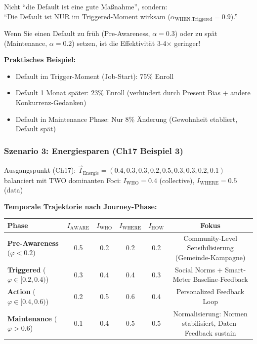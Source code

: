 \begin{tcolorbox}[colback=red!5!white, colframe=red!75!black, title=\textbf{Der Default-Nudge als Timing-Intervention}]

Nicht ``die Default ist eine gute Maßnahme'', sondern: \\
``Die Default ist NUR im Triggered-Moment wirksam ($\alpha_{\text{WHEN},\text{Triggered}} = 0.9$).''

Wenn Sie einen Default zu früh (Pre-Awareness, $\alpha = 0.3$) oder zu spät (Maintenance, $\alpha = 0.2$) setzen, ist die Effektivität 3-4× geringer!

\textbf{Praktisches Beispiel:}
\begin{itemize}[nosep]
\item Default im Trigger-Moment (Job-Start): 75\% Enroll
\item Default 1 Monat später: 23\% Enroll (verhindert durch Present Bias + andere Konkurrenz-Gedanken)
\item Default in Maintenance Phase: Nur 8\% Änderung (Gewohnheit etabliert, Default spät)
\end{itemize}

\end{tcolorbox}

\subsubsection{Szenario 3: Energiesparen (Ch17 Beispiel 3)}

Ausgangspunkt (Ch17): $\vec{I}_{\text{Energie}} = (0.4, 0.3, 0.3, 0.2, 0.5, 0.3, 0.3, 0.2, 0.1)$ — balanciert mit TWO dominanten Foci: $I_{\text{WHO}} = 0.4$ (collective), $I_{\text{WHERE}} = 0.5$ (data)

\textbf{Temporale Trajektorie nach Journey-Phase:}

\begin{center}
\small
\renewcommand{\arraystretch}{1.3}
\begin{tabular}{@{}lccccc@{}}
\toprule
\textbf{Phase} & $I_{\text{AWARE}}$ & $I_{\text{WHO}}$ & $I_{\text{WHERE}}$ & $I_{\text{HOW}}$ & \textbf{Fokus} \\
\midrule
\textbf{Pre-Awareness} ($\varphi < 0.2$) & 0.5 & 0.2 & 0.2 & 0.2 & Community-Level Sensibilisierung (Gemeinde-Kampagne) \\
\textbf{Triggered} ($\varphi \in [0.2, 0.4)$) & 0.3 & 0.4 & 0.4 & 0.3 & Social Norms + Smart-Meter Baseline-Feedback \\
\textbf{Action} ($\varphi \in [0.4, 0.6)$) & 0.2 & 0.5 & 0.6 & 0.4 & Personalized Feedback Loop \\
\textbf{Maintenance} ($\varphi > 0.6$) & 0.1 & 0.4 & 0.5 & 0.5 & Normalisierung: Normen stabilisiert, Daten-Feedback sustain \\
\bottomrule
\end{tabular}
\end{center}


